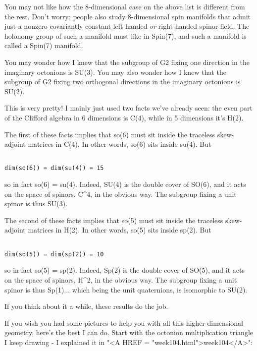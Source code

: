 You may not like how the 8-dimensional case on the above list is
different from the rest.  Don't worry; people also study 8-dimensional
spin manifolds that admit just a nonzero covariantly constant
left-handed \emph{or} right-handed spinor field.  The holonomy group of
such a manifold must like in Spin(7), and such a manifold is called a
Spin(7) manifold.

You may wonder how I knew that the subgroup of G2 fixing
one direction in the imaginary octonions is SU(3).  You may
also wonder how I knew that the subgroup of G2 fixing two 
orthogonal directions in the imaginary octonions is SU(2).

This is very pretty!  I mainly just used two facts we've already 
seen: the even part of the Clifford algebra in 6 dimensions is C(4), 
while in 5 dimensions it's H(2).  

The first of these facts implies that so(6) must sit inside
the traceless skew-adjoint matrices in C(4).  In other words, 
so(6) sits inside su(4).  But 


\begin{verbatim}

dim(so(6)) = dim(su(4)) = 15
\end{verbatim}
    
so in fact so(6) = su(4).  Indeed, SU(4) is the double
cover of SO(6), and it acts on the space of spinors, C^{4}, 
in the obvious way.  The subgroup fixing a unit spinor is 
thus SU(3).   

The second of these facts implies that so(5) must sit inside
the traceless skew-adjoint matrices in H(2).  In other words,
so(5) sits inside sp(2).  But


\begin{verbatim}

dim(so(5)) = dim(sp(2)) = 10
\end{verbatim}
    
so in fact so(5) = sp(2).  Indeed, Sp(2) is the double
cover of SO(5), and it acts on the space of spinors, H^{2},
in the obvious way.  The subgroup fixing a unit spinor is
thus Sp(1)... which being the unit quaternions, is isomorphic to SU(2).

If you think about it a while, these results do the job.

If you wish you had some pictures to help you with all this
higher-dimensional geometry, here's the best I can do.  Start
with the octonion multiplication triangle I keep drawing - 
I explained it in "<A HREF = "week104.html">week104</A>": 



